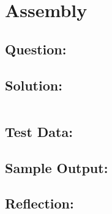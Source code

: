 \documentclass[Lab-B.tex]{subfiles}
\begin{document}
    \section{Assembly}
        \subsection*{Question:}
            
        \subsection*{Solution:}
            \inputminted{cpp}{../03-Assembly/Assembly.cpp}%

        \subsection*{Test Data:}
        
        \subsection*{Sample Output:}

        \subsection*{Reflection:}
\end{document}

